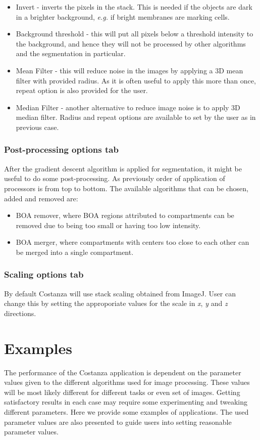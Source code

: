 \documentclass[a4paper,12pt]{article}
\begin{document}
\begin{itemize}
%
\item Invert - inverts the pixels in the stack. This is needed if the objects
	are dark in a brighter background, \textit{e.g.} if bright membranes are marking
	cells.
%
\item Background threshold - this will put all pixels below a threshold
	intensity to the background, and hence they will not be processed by other algorithms and 
	the segmentation in particular.
%
\item Mean Filter - this will reduce noise in the images by applying a 3D mean
	filter with provided radius. As it is often useful to apply this more than
	once, repeat option is also provided for the user.
%
\item Median Filter - another alternative to reduce image noise is to apply 3D median filter.
	Radius and repeat options are available to set by the user as in previous case.
%
\end{itemize}

\subsubsection{Post-processing options tab}
After the gradient descent algorithm is applied for segmentation, it might be
useful to do some post-processing. As previously order of application of processors is from top to bottom. The available algorithms that can be chosen, added and removed are:

\begin{itemize} 
%
\item BOA remover, where BOA regions attributed to compartments can be removed due to being too small
	or having too low intensity.
%
\item BOA merger, where compartments with centers too close to each other can be
	merged into a single compartment.
%
\end{itemize}

\subsubsection{Scaling options tab}
By default Costanza will use stack scaling obtained from ImageJ. User can change this by setting the approporiate values for the scale in \textit{x}, \textit{y} and \textit{z} directions.

\section{Examples}
The performance of the Costanza application is dependent on the
parameter values given to the different algorithms used for image processing. These values will be most likely different for different tasks or even set of images. Getting satisfactory results in each case may require some experimenting and tweaking different parameters. Here we provide
some examples of applications. The used parameter values are also
presented to guide users into setting reasonable parameter values.
\end{document}
